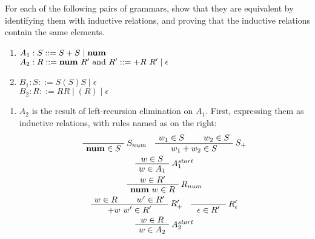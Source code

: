 
\begin{exercise}{}
  For each of the following pairs of grammars, show that they are equivalent by
  identifying them with inductive relations, and proving that the inductive
  relations contain the same elements.

  \begin{enumerate}
    \item 
    \(A_1 : S ::= S + S \mid \mathbf{num} \) \\ 
    \(A_2 : R ::= \mathbf{num} ~R' \text{ and } R' ::= + R~ R' \mid \epsilon\)
    \item 
    \(B_1 : S ::= S(S)S \mid \epsilon \) \\ 
    \(B_2 : R ::= RR \mid (R) \mid \epsilon\)
  \end{enumerate}

  \begin{solution}
    \begin{enumerate}
      \item \(A_2\) is the result of left-recursion elimination on \(A_1\).
      First, expressing them as inductive relations, with rules named as on the
      right:
      \addtolength{\jot}{1ex}
      \begin{gather*}
        \AxiomC{\phantom{\(w_1 \in S\)}}
        \RightLabel{\(S_{num}\)}
        \UnaryInfC{\(\num \in S\)}
        \DisplayProof 
        \quad
        \AxiomC{\(w_1 \in S\)}
        \AxiomC{\(w_2 \in S\)}
        \RightLabel{\(S_+\)}
        \BinaryInfC{\(w_1 + w_2 \in S\)}
        \DisplayProof \\
        \AxiomC{\(w \in S\)}
        \RightLabel{\(A_{1}^{start}\)}
        \UnaryInfC{\(w \in A_1\)}
        \DisplayProof \\
        \AxiomC{\(w \in R'\)}
        \RightLabel{\(R_{num}\)}
        \UnaryInfC{\(\num~ w\in R\)}
        \DisplayProof \\
        \AxiomC{\(w \in R\)}
        \AxiomC{\(w' \in R'\)}
        \RightLabel{\(R'_{+}\)}
        \BinaryInfC{\(+w ~ w' \in R'\)}
        \DisplayProof 
        \quad
        \AxiomC{\phantom{\(w' \in R'\)}}
        \RightLabel{\(R'_{\epsilon}\)}
        \UnaryInfC{\(\epsilon \in R'\)}
        \DisplayProof \\
        \AxiomC{\(w \in R\)}
        \RightLabel{\(A_{2}^{start}\)}
        \UnaryInfC{\(w \in A_2\)}
        \DisplayProof
      \end{gather*}


\end{enumerate}
\end{solution}
\end{exercise}
